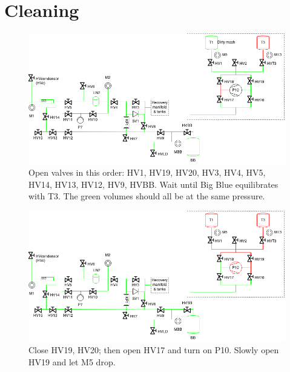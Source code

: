 \documentclass[a4paper,10pt]{article}
\begin{document}
\section{Cleaning}

\begin{figure}[htbp!]
 \centering
 \includegraphics[width=\textwidth]{./mash-cleaning-02.png}
 \caption{Open valves in this order: HV1, HV19, HV20, HV3, HV4, HV5, HV14, HV13, HV12, HV9, HVBB.  Wait until Big Blue equilibrates with T3.  The green volumes should all be at the same pressure.}
 \label{b}
\end{figure}

\begin{figure}[htbp!]
 \centering
 \includegraphics[width=\textwidth]{./mash-cleaning-03.png}
 \caption{Close HV19, HV20; then open HV17 and turn on P10.  Slowly open HV19 and let M5 drop.}
 \label{c}
\end{figure}
\end{document}
